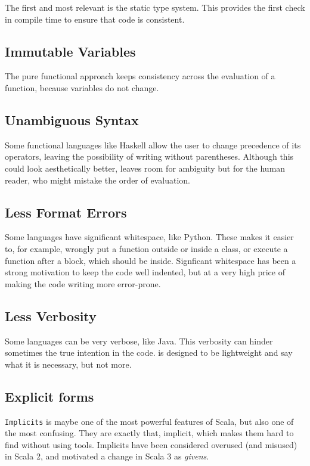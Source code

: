 The first and most relevant is the static type system.
This provides the first check in compile time to ensure that \Soda code is consistent.

\subsection{Immutable Variables}

The pure functional approach keeps consistency across the evaluation of a function, because variables do not change.

\subsection{Unambiguous Syntax}

Some functional languages like Haskell allow the user to change precedence of its operators, leaving the possibility of writing without parentheses.
Although this could look aesthetically better, leaves room for ambiguity but for the human reader, who might mistake the order of evaluation.

\subsection{Less Format Errors}

Some languages have significant whitespace, like Python.
These makes it easier to, for example, wrongly put a function outside or inside a class, or execute a function after a block, which should be inside.
Signficant whitespace has been a strong motivation to keep the code well indented, but at a very high price of making the code writing more error-prone.

\subsection{Less Verbosity}

Some languages can be very verbose, like Java.
This verbosity can hinder sometimes the true intention in the code.
\Sode is designed to be lightweight and say what it is necessary, but not more.

\subsection{Explicit forms}

\texttt{Implicits} is maybe one of the most powerful features of Scala, but also one of the most confusing.
They are exactly that, implicit, which makes them hard to find without using tools.
Implicits have been considered overused (and misused) in Scala 2, and motivated a change in Scala 3 as \textit{givens}.

